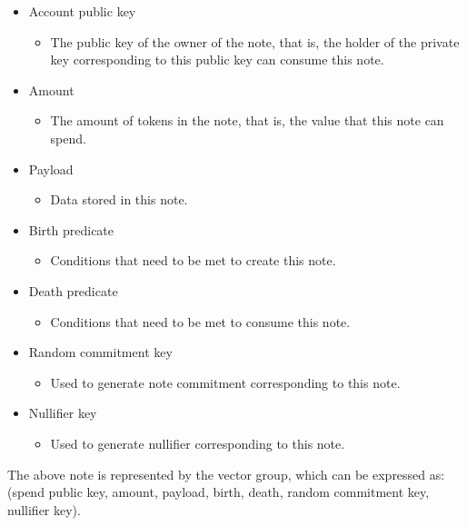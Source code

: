 \begin{itemize}
    \item Account public key
        \begin{itemize}
            \item The public key of the owner of the note, that is, the holder of the private key corresponding to this public key can consume this note.
        \end{itemize}
    \item Amount
        \begin{itemize}
            \item The amount of tokens in the note, that is, the value that this note can spend.
        \end{itemize}
    \item Payload
        \begin{itemize}
            \item Data stored in this note.
        \end{itemize}
    \item Birth predicate
        \begin{itemize}
            \item Conditions that need to be met to create this note.
        \end{itemize}
    \item Death predicate
        \begin{itemize}
            \item Conditions that need to be met to consume this note.
        \end{itemize}
    \item Random commitment key
        \begin{itemize}
            \item Used to generate note commitment corresponding to this note.
        \end{itemize}
    \item Nullifier key
        \begin{itemize}
            \item Used to generate nullifier corresponding to this note.
        \end{itemize}
\end{itemize}

The above note is represented by the vector group, which can be expressed as: 
(spend public key, amount, payload, birth, death, random commitment key, nullifier key).